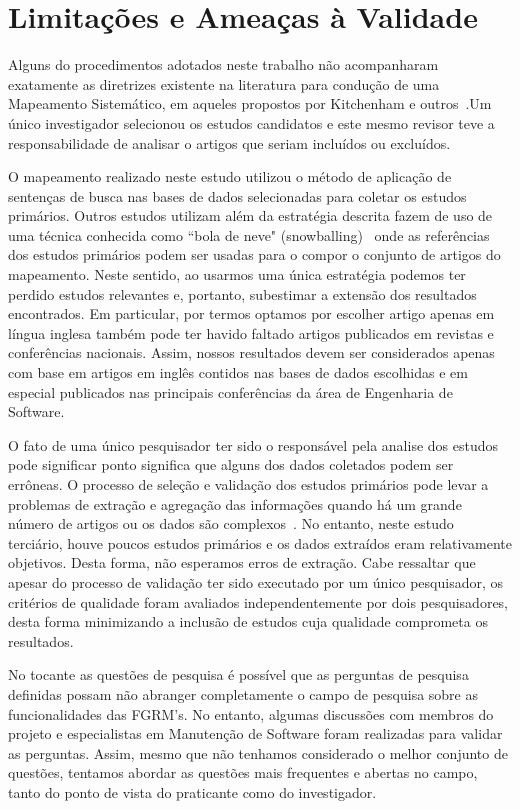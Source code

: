 \section{Limitações e Ameaças à Validade}
\label{sec:limitacoes_ameacas}

Alguns do procedimentos adotados neste trabalho não acompanharam exatamente as
diretrizes existente na literatura para condução de uma Mapeamento Sistemático, em
aqueles propostos por Kitchenham e outros~\cite{keele2007guidelines}.Um único
investigador selecionou os estudos candidatos e este mesmo revisor teve a
responsabilidade de analisar o artigos que seriam incluídos ou excluídos.

O mapeamento realizado neste estudo utilizou o método de aplicação de sentenças
de busca nas bases de dados selecionadas para coletar os estudos primários.
Outros estudos utilizam além da estratégia descrita fazem de uso de uma técnica
conhecida  como ``bola de neve" (snowballing)~\cite{wohlin2014guidelines} onde
as referências dos estudos primários podem ser usadas para o compor o conjunto
de artigos do mapeamento. Neste sentido, ao usarmos uma única estratégia podemos
ter perdido estudos relevantes e, portanto, subestimar a extensão dos resultados
encontrados. Em particular, por termos optamos por escolher artigo apenas em
língua inglesa também pode ter havido faltado artigos publicados em revistas e
conferências nacionais.  Assim, nossos resultados devem ser considerados apenas
com base em artigos em inglês contidos nas bases de dados escolhidas  e em
especial publicados nas principais conferências da área de Engenharia de
Software.

O fato de uma único pesquisador ter sido o responsável pela analise dos estudos
pode significar ponto significa que alguns dos dados coletados podem ser
errôneas. O processo de seleção e validação dos estudos primários pode levar
a problemas de extração e agregação das informações quando há um grande número
de artigos ou os dados são complexos~\cite{keele2007guidelines}. No entanto,
neste estudo terciário, houve poucos estudos primários e os dados extraídos eram
relativamente objetivos. Desta forma, não esperamos erros de extração. Cabe
ressaltar que apesar do processo de validação ter sido executado por um único
pesquisador, os critérios de qualidade foram avaliados independentemente por
dois pesquisadores, desta forma minimizando a inclusão de estudos cuja qualidade
comprometa os resultados. 

No tocante as questões de pesquisa é  possível que as perguntas de pesquisa
definidas possam não abranger completamente o campo de pesquisa sobre as
funcionalidades das FGRM's. No entanto, algumas discussões com membros do
projeto e especialistas em Manutenção de Software foram realizadas para validar
as perguntas. Assim, mesmo que não tenhamos considerado o melhor conjunto de
questões, tentamos abordar as questões mais frequentes e abertas no campo, tanto
do ponto de vista do praticante como do investigador.

